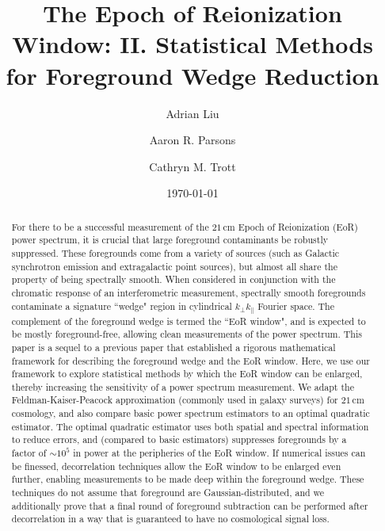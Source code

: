 \documentclass[twocolumn,aps,prd,nofootinbib,showpacs]{revtex4-1}
\begin{document}
\title{The Epoch of Reionization Window: II. Statistical Methods for Foreground Wedge Reduction}

\author{Adrian Liu}
\author{Aaron R. Parsons}
\author{Cathryn M. Trott}
\date{\today}

\newcommand{\apjs}{Astrophys. J. Suppl. Ser.}
\newcommand{\aj}{Astron. J.}
\newcommand{\mnras}{Mon. Not. R. Astron. Soc.}
\newcommand{\apjl}{Astrophys. J. Lett.}
\newcommand{\aap}{Astron. Astrophys.}
\newcommand{\pasa}{PASA}
\newcommand{\physrep}{Phys. Rep.}
\newcommand{\araa}{Annu. Rev. Astron. Astrophys.}




\begin{abstract}
For there to be a successful measurement of the $21\,\textrm{cm}$ Epoch of Reionization (EoR) power spectrum, it is crucial that large foreground contaminants be robustly suppressed.  These foregrounds come from a variety of sources (such as Galactic synchrotron emission and extragalactic point sources), but almost all share the property of being spectrally smooth.  When considered in conjunction with the chromatic response of an interferometric measurement, spectrally smooth foregrounds contaminate a signature ``wedge" region in cylindrical $k_\perp k_\parallel$ Fourier space.  The complement of the foreground wedge is termed the ``EoR window", and is expected to be mostly foreground-free, allowing clean measurements of the power spectrum.  This paper is a sequel to a previous paper that established a rigorous mathematical framework for describing the foreground wedge and the EoR window.  Here, we use our framework to explore statistical methods by which the EoR window can be enlarged, thereby increasing the sensitivity of a power spectrum measurement.  We adapt the Feldman-Kaiser-Peacock approximation (commonly used in galaxy surveys) for $21\,\textrm{cm}$ cosmology, and also compare basic power spectrum estimators to an optimal quadratic estimator.  The optimal quadratic estimator uses both spatial and spectral information to reduce errors, and (compared to basic estimators) suppresses foregrounds by a factor of $\sim 10^5$ in power at the peripheries of the EoR window.  If numerical issues can be finessed, decorrelation techniques allow the EoR window to be enlarged even further, enabling measurements to be made deep within the foreground wedge.  These techniques do not assume that foreground are Gaussian-distributed, and we additionally prove that a final round of foreground subtraction can be performed after decorrelation in a way that is guaranteed to have no cosmological signal loss.
\end{abstract}
\end{document}
